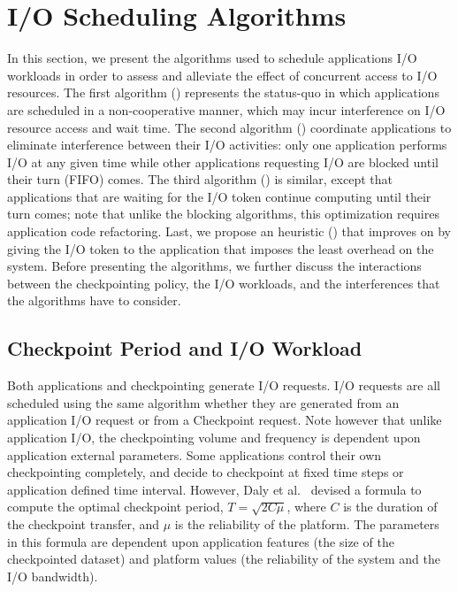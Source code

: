 \section{I/O Scheduling Algorithms}\label{sec:algorithms}

In this section, we present the algorithms used to schedule applications
I/O workloads in order to assess and alleviate the effect of concurrent access
to I/O resources. The first algorithm (\nocoop) represents the status-quo
in which applications are scheduled in a non-cooperative manner, which may
incur interference on I/O resource access and wait time. The second
algorithm (\fifoblock) coordinate applications to eliminate interference
between their I/O activities: only one application performs I/O at any given
time while other applications requesting I/O are blocked until their
turn (FIFO) comes. The third algorithm (\fifononblock) is similar, except
that applications that are waiting for the I/O token
continue computing until their turn comes; note that unlike the
blocking algorithms, this optimization requires
application code refactoring. Last, we propose an heuristic
(\leastwaste) that improves on \fifononblock by giving the I/O token
to the application that imposes the least overhead on the system. Before
presenting the algorithms, we further discuss the interactions between
the checkpointing policy, the I/O workloads, and the interferences that the
algorithms have to consider.


\subsection{Checkpoint Period and I/O Workload}

Both applications and checkpointing generate I/O requests. I/O requests
are all scheduled using the same algorithm whether they
are generated from an application I/O request or from a Checkpoint
request. Note however that unlike application I/O, the checkpointing
volume and frequency is dependent upon application external parameters.
Some applications
control their own checkpointing completely, and decide to checkpoint at
fixed time steps or application defined time interval. However,
Daly et al.~\cite{daly} devised a formula to compute the optimal
checkpoint period, $T=\sqrt{2 C \mu}$, where $C$ is the duration of the
checkpoint transfer, and $\mu$ is the reliability of the platform.
The parameters in this formula are dependent upon application features
(the size of the checkpointed dataset) and platform values (the reliability
of the system and the I/O bandwidth).

